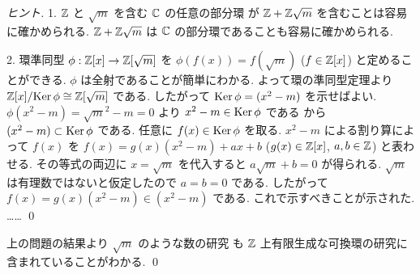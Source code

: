 \documentclass[12pt,twoside]{jarticle}
\begin{document}
\begin{proof}[ヒント]
 1. ${\mathbb Z}$ と $\sqrt{m}$ を含む ${\mathbb C}$ の任意の部分環
 が ${\mathbb Z}+{\mathbb Z}\sqrt{m}$ を含むことは容易に確かめられる.
 ${\mathbb Z}+{\mathbb Z}\sqrt{m}$ は ${\mathbb C}$ の部分環であることも容易に確かめられる.

 2. 環準同型 $\phi:{\mathbb Z}[x]\to{\mathbb Z}[\sqrt{m}]$ を $\phi(f(x))=f(\sqrt{m})$ 
 ($f\in{\mathbb Z}[x]$) と定めることができる. $\phi$ は全射であることが簡単にわかる. 
 よって環の準同型定理より ${\mathbb Z}[x]/\!\mathop{\mathrm{Ker}}\nolimits\phi\cong{\mathbb Z}[\sqrt{m}]$ である. 
 したがって $\mathop{\mathrm{Ker}}\nolimits\phi=(x^2-m)$ を示せばよい.
 $\phi(x^2-m)=\sqrt{m}^2-m=0$ より $x^2-m\in\mathop{\mathrm{Ker}}\nolimits\phi$ である
 から $(x^2-m)\subset\mathop{\mathrm{Ker}}\nolimits\phi$ である.
 任意に $f(x)\in\mathop{\mathrm{Ker}}\nolimits\phi$ を取る. 
 $x^2-m$ による割り算によって $f(x)$ を $f(x)=g(x)(x^2-m)+ax+b$ 
 ($g(x)\in{\mathbb Z}[x]$, $a,b\in{\mathbb Z}$) と表わせる. 
 その等式の両辺に $x=\sqrt{m}$ を代入すると
\ifx\STUDENT\undefined
 $a\sqrt{m}+b=0$ が得られる.
 $\sqrt{m}$ は有理数ではないと仮定したので $a=b=0$ である.
 したがって $f(x)=g(x)(x^2-m)\in(x^2-m)$ である.
 これで示すべきことが示された.
\else
 ……
\fi
 \qed
\end{proof}

\begin{rem}
 上の問題の結果より $\sqrt{m}$ のような数の研究
 も ${\mathbb Z}$ 上有限生成な可換環の研究に含まれていることがわかる.
 \qed
\end{rem}
\end{document}
